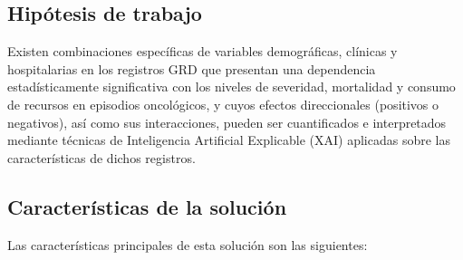 \subsection{Hipótesis de trabajo}
\label{intro:hipotesis}

Existen combinaciones específicas de variables demográficas, clínicas y hospitalarias en los registros GRD que presentan una dependencia estadísticamente significativa con los niveles de severidad, mortalidad y consumo de recursos en episodios oncológicos, y cuyos efectos direccionales (positivos o negativos), así como sus interacciones, pueden ser cuantificados e interpretados mediante técnicas de Inteligencia Artificial Explicable (XAI) aplicadas sobre las características de dichos registros.

\subsection{Características de la solución}
\label{intro:caracteristicas}

Las características principales de esta solución son las siguientes:

